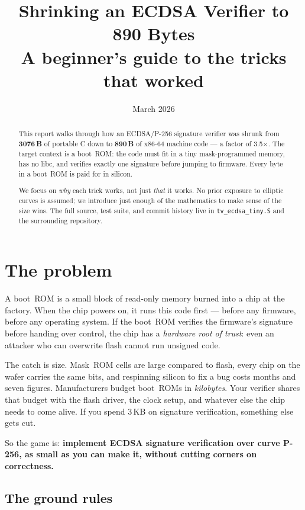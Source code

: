 \documentclass[11pt,a4paper]{article}
\title{\bfseries Shrinking an ECDSA Verifier to 890 Bytes\\[0.3em]
       \large A beginner's guide to the tricks that worked}
\author{}
\date{March 2026}
\newcommand{\bytes}[1]{\textcolor{blue!60!black}{\textbf{#1\,B}}}
\begin{document}
\maketitle

\begin{abstract}\noindent
This report walks through how an ECDSA/P-256 signature verifier was
shrunk from \bytes{3076} of portable C down to \bytes{890} of x86-64
machine code --- a factor of 3.5$\times$. The target context is a
boot~ROM: the code must fit in a tiny mask-programmed memory, has no
libc, and verifies exactly one signature before jumping to firmware.
Every byte in a boot~ROM is paid for in silicon.

We focus on \emph{why} each trick works, not just \emph{that} it
works. No prior exposure to elliptic curves is assumed; we introduce
just enough of the mathematics to make sense of the size wins. The
full source, test suite, and commit history live in
\texttt{tv\_ecdsa\_tiny.S} and the surrounding repository.
\end{abstract}

\tableofcontents

\section{The problem}
\label{sec:problem}

A boot~ROM is a small block of read-only memory burned into a chip at
the factory. When the chip powers on, it runs this code first --- before
any firmware, before any operating system. If the boot~ROM verifies
the firmware's signature before handing over control, the chip has a
\emph{hardware root of trust}: even an attacker who can overwrite
flash cannot run unsigned code.

The catch is size. Mask~ROM cells are large compared to flash, every
chip on the wafer carries the same bits, and respinning silicon to fix
a bug costs months and seven figures. Manufacturers budget boot~ROMs in
\emph{kilobytes}. Your verifier shares that budget with the flash
driver, the clock setup, and whatever else the chip needs to come
alive. If you spend 3\,KB on signature verification, something else
gets cut.

So the game is: \textbf{implement ECDSA signature verification over
curve P-256, as small as you can make it, without cutting corners on
correctness.}

\subsection{The ground rules}
\end{document}
